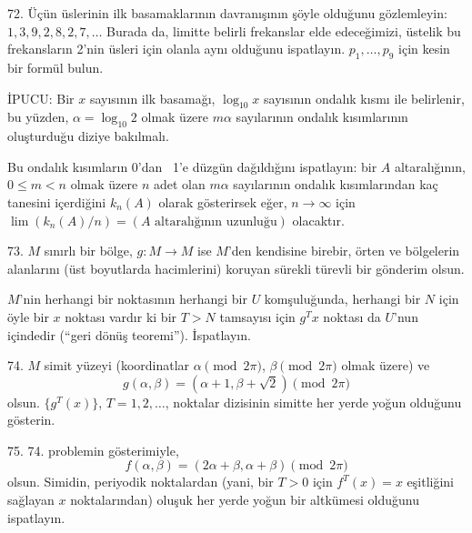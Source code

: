 \begin{problem}{72.}
	Üçün üslerinin ilk basamaklarının davranışının şöyle olduğunu gözlemleyin: $1,
	3, 9, 2, 8, 2, 7, \dotsc$ Burada da, limitte  belirli frekanslar elde edeceğimizi, üstelik bu frekansların  2'nin üsleri için olanla aynı ol\-du\-ğu\-nu ispatlayın.
	$p_1, \dotsc, p_9$ için kesin bir formül bulun.

	\begin{note}{{\. I}PUCU:}
		Bir $x$ sayısının ilk basamağı,  $\log_{10} x$ sayısının ondalık kısmı ile belirlenir, bu yüzden, $\alpha=\log_{10} 2$ olmak üzere  $m \alpha$ sayılarının ondalık kısımlarının oluşturduğu diziye bakılmalı.
	\end{note}
	Bu ondalık kısımların 0'dan ~1'e düzgün dağıldığını ispatlayın: bir $A$ altaralığının, $0 \leqslant m<n$ olmak üzere $n$ adet olan $m \alpha$ sayılarının ondalık kısımlarından kaç tanesini içerdiğini  $k_n (A)$ olarak gösterirsek eğer, $n \to \infty$ için	$\lim (k_n (A)/n)=(\text{$A$~altaralığının uzunluğu})$ olacaktır.
\end{problem}

\begin{problem}{73.}
	$M$ sınırlı bir bölge,  $g\colon M \to M$ ise   $M$'den kendisine birebir, örten ve bölgelerin alanlarını (üst boyutlarda hacimlerini) koruyan sürekli türevli bir gönderim olsun.

	$M$'nin herhangi bir noktasının her\-han\-gi bir $U$ komşuluğunda, her\-han\-gi bir $N$ için öyle bir $x$ noktası vardır ki bir $T>N$ tamsayısı için $g^T x$ noktası da $U$'nun içindedir (\enquote{geri dönüş teoremi}). İspatlayın.  
\end{problem}

\begin{problem}{74.}
	$M$ simit yüzeyi (koordinatlar $\alpha \pmod{2\pi}$, $\beta \pmod{2\pi}$ olmak üzere) ve
	\begin{equation*}
		g(\alpha, \beta)=(\alpha+1, \beta+ \sqrt{2}) \pmod{2\pi}
	\end{equation*}
olsun.
	$\{g^T (x)\}$, $T=1, 2, \dotsc$, noktalar dizisinin simitte her yerde yoğun olduğunu gösterin.
\end{problem}

\begin{problem}{75.}
	74. problemin gösterimiyle,
	\begin{equation*}
		f(\alpha, \beta)=(2\alpha+\beta,\alpha+\beta) \pmod{2\pi}
	\end{equation*} 
	olsun. Simidin, periyodik noktalardan (yani, bir $T>0$ için
	$f^{T} (x)=x$ eşitliğini sağlayan $x$ noktalarından) oluşuk her yerde yoğun bir altkümesi olduğunu ispatlayın.
\end{problem}

